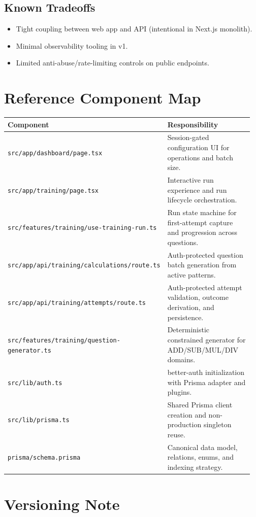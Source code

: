 \documentclass[11pt]{article}
\begin{document}
\subsection*{Known Tradeoffs}

\begin{itemize}[leftmargin=*]
	\item Tight coupling between web app and API (intentional in Next.js monolith).
	\item Minimal observability tooling in v1.
	\item Limited anti-abuse/rate-limiting controls on public endpoints.
\end{itemize}

\section{Reference Component Map}

\begin{longtable}{@{}p{0.28\linewidth}p{0.68\linewidth}@{}}
\toprule
Component & Responsibility \\
\midrule
\texttt{src/app/dashboard/page.tsx} & Session-gated configuration UI for operations and batch size. \\
\texttt{src/app/training/page.tsx} & Interactive run experience and run lifecycle orchestration. \\
\texttt{src/features/training/use-training-run.ts} & Run state machine for first-attempt capture and progression across questions. \\
\texttt{src/app/api/training/calculations/route.ts} & Auth-protected question batch generation from active patterns. \\
\texttt{src/app/api/training/attempts/route.ts} & Auth-protected attempt validation, outcome derivation, and persistence. \\
\texttt{src/features/training/question-generator.ts} & Deterministic constrained generator for ADD/SUB/MUL/DIV domains. \\
\texttt{src/lib/auth.ts} & better-auth initialization with Prisma adapter and plugins. \\
\texttt{src/lib/prisma.ts} & Shared Prisma client creation and non-production singleton reuse. \\
\texttt{prisma/schema.prisma} & Canonical data model, relations, enums, and indexing strategy. \\
\bottomrule
\end{longtable}

\section{Versioning Note}
\end{document}
